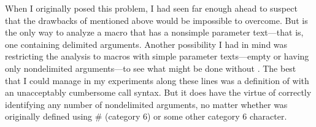When I originally posed this problem, I had seen far enough ahead to
suspect that the drawbacks of \cmd{\meaning} mentioned above would be
impossible to overcome. But \cmd{\meaning} is the only way to analyze a
macro that has a nonsimple parameter text---that is, one containing
delimited arguments. Another possibility I had in mind was restricting
the analysis to macros with simple parameter texts---empty or having
only nondelimited arguments---to see what might be done without
\cmd{\meaning}. The best that I could manage in my experiments along these
lines was a definition of \cmd{\args} with an unacceptably cumbersome call
syntax. But it does have the virtue of correctly identifying any
number of nondelimited arguments, no matter whether \cmd{\foo} was
originally defined using \# (category 6) or some other category 6
character.


